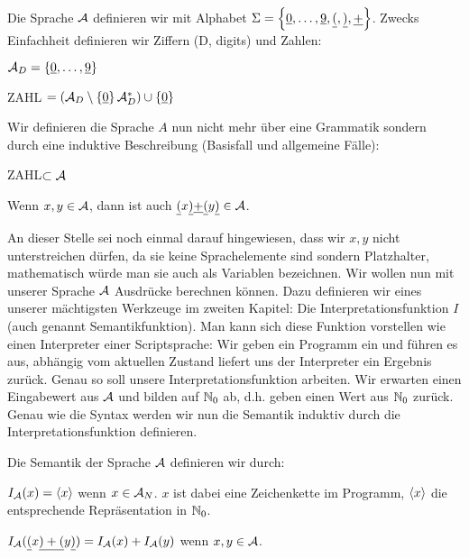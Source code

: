 \begin{defn}
Die Sprache $\mathcal{A}$ definieren wir mit Alphabet $\Sigma=\left\{\underline{0},\ldots,\underline{9},\underline{(},\underline{)},\underline{+}\right\}$.
Zwecks Einfachheit definieren wir Ziffern (D, digits) und Zahlen:
\begin{\whichitem}
\item $\mathcal{A}_D = \left\{\underline{0},\ldots,\underline{9}\right\}$
\item ZAHL $= (\mathcal{A}_D \setminus \left\{\underline{0}\right\} \mathcal{A}_D^*) \cup \left\{\underline{0}\right\}$
\end{\whichitem}
Wir definieren die Sprache $A$ nun nicht mehr über eine Grammatik sondern durch eine induktive Beschreibung (Basisfall und allgemeine Fälle):
\begin{\whichenum}
\item ZAHL$\subset \mathcal{A}$
\item Wenn $x,y \in \mathcal{A}$, dann ist auch $\underline{(} x \underline{)} \underline{+} \underline{(} y \underline{)} \in \mathcal{A}$.
\end{\whichenum}
\end{defn}
An dieser Stelle sei noch einmal darauf hingewiesen, dass wir $x,y$ nicht unterstreichen dürfen, da sie keine Sprachelemente sind sondern
Platzhalter, mathematisch würde man sie auch als Variablen bezeichnen.
Wir wollen nun mit unserer Sprache $\mathcal{A}$ Ausdrücke berechnen können.
Dazu definieren wir eines unserer mächtigsten Werkzeuge im zweiten Kapitel:
Die Interpretationsfunktion $I$ (auch genannt Semantikfunktion).
Man kann sich diese Funktion vorstellen wie einen Interpreter einer Scriptsprache:
Wir geben ein Programm ein und führen es aus, abhängig vom aktuellen Zustand liefert
uns der Interpreter ein Ergebnis zurück.
Genau so soll unsere Interpretationsfunktion arbeiten.
Wir erwarten einen Eingabewert aus $\mathcal{A}$ und bilden auf $\mathbb{N}_0$ ab, d.h. geben
einen Wert aus $\mathbb{N}_0$ zurück.
Genau wie die Syntax werden wir nun die Semantik induktiv durch die Interpretationsfunktion definieren.
\begin{defn}
Die Semantik der Sprache $\mathcal{A}$ definieren wir durch:
\begin{\whichenum}
\item $I_{\mathcal{A}}(x) = \left<x\right>$ wenn $x \in \mathcal{A}_N$. $x$ ist dabei eine Zeichenkette im Programm, $\left<x\right>$ die
entsprechende Repräsentation in $\mathbb{N}_0$.
\item $I_{\mathcal{A}}(\underline{(}x\underline{)+(}y\underline{)})=I_{\mathcal{A}}(x) + I_{\mathcal{A}}(y)$ wenn $x,y \in \mathcal{A}$.
\end{\whichenum}
\end{defn}
